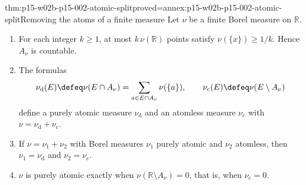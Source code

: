 \begin{hblemma}{thm:p15-w02b-p15-002-atomic-split}{proved=annex:p15-w02b-p15-002-atomic-split}{Removing the atoms of a finite measure}
Let \(\nu\) be a finite Borel measure on \(\mathbb R\).
\begin{enumerate}
\item For each integer \(k\geq1\), at most \(k\,\nu(\mathbb R)\) points
      satisfy \(\nu(\{x\})\geq1/k\). Hence \(A_\nu\) is countable.
\item The formulas
      \[
       \nu_{\mathrm d}(E)\defeq\nu(E\cap A_\nu)
                       =\sum_{a\in E\cap A_\nu}\nu(\{a\}),
       \qquad
       \nu_{\mathrm c}(E)\defeq\nu(E\setminus A_\nu)
      \]
      define a purely atomic measure \(\nu_{\mathrm d}\) and an atomless
      measure \(\nu_{\mathrm c}\) with \(\nu=\nu_{\mathrm d}+\nu_{\mathrm c}\).
\item If \(\nu=\nu_1+\nu_2\) with Borel measures \(\nu_1\) purely atomic
      and \(\nu_2\) atomless, then \(\nu_1=\nu_{\mathrm d}\) and
      \(\nu_2=\nu_{\mathrm c}\).
\item \(\nu\) is purely atomic exactly when
      \(\nu(\mathbb R\setminus A_\nu)=0\), that is, when
      \(\nu_{\mathrm c}=0\).
\end{enumerate}
\end{hblemma}

